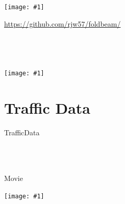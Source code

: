 \documentclass[aspectratio=169]{beamer}
\newcommand{\tallimage}[1]{%
  \begin{frame}
    \centering
    \texttt{[image: \#1]}
    \\
  \end{frame}
}
\newcommand{\wideimage}[1]{%
  \begin{frame}
    \centering
    \texttt{[image: \#1]}
    \\
  \end{frame}
}
\begin{document}
\begin{frame}
  \inputminted[firstline=21, lastline=31]{python}{bng-links.py}
\end{frame}

\wideimage{img/bng-links.pdf}

\begin{frame}
  \centering
  \parbox{0.6\textwidth}{%
    \url{https://github.com/rjw57/foldbeam/}
    \\
    \vspace{2\baselineskip}
    \inputminted{console}{foldbeam-render.sh}
  }
  \\
\end{frame}

\begin{frame}
  \inputminted[firstline=33, lastline=40]{python}{bng-links.py}
\end{frame}

\wideimage{img/bng-links-2.pdf}

\section{Traffic Data}

\begin{frame}
  \centering\Huge
  TrafficData
  \\
\end{frame}

\begin{frame}
  \inputminted{xml}{TrafficData/content.xml}
\end{frame}

\begin{frame}
  \inputminted{python}{TrafficData/parse.py}
\end{frame}

\begin{frame}
  \inputminted{python}{TrafficData/link_data.py}
\end{frame}

\begin{frame}
  \inputminted{python}{TrafficData/hist.py}
\end{frame}

\begin{frame}
  \centering\Huge
  Movie
  \\
\end{frame}

\tallimage{img/git-repo.png}

\begin{frame}
  \inputminted{python}{bng-speed-links.py}
\end{frame}
\end{document}
